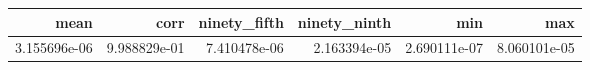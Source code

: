 \begin{tabular}{rrrrrr}
\toprule
mean & corr & ninety_fifth & ninety_ninth & min & max \\
\midrule
3.155696e-06 & 9.988829e-01 & 7.410478e-06 & 2.163394e-05 & 2.690111e-07 & 8.060101e-05 \\
\bottomrule
\end{tabular}
